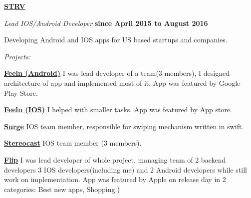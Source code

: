 \documentclass[10pt]{article}
\newenvironment{outerlist}[0]%
        {\begin{itemize}}
        {\end{itemize}
         \vspace{-.6\baselineskip}}
\newenvironment{innerlist}[0]%
        {\begin{compactitem}}
        {\end{compactitem}}
\newcommand{\blankline}{\quad\pagebreak[2]}
\begin{document}
\href{http://www.strv.com/}{\textbf{STRV}}
\begin{outerlist}
  \item[] \textit{Lead IOS/Android Developer}%
          \hfill \textbf{since April 2015 to August 2016}
  \begin{innerlist}
    \item[] Developing Android and IOS apps for US based startups
and companies.
  \end{innerlist}
    \item[] \textit{Projects:}%
    	 \begin{innerlist}
	 	 \item[]  \href{https://play.google.com/store/apps/details?id=com.feeln.android}{\textbf{Feeln (Android)}} \newline
		 I was lead developer of a team(3 members), I designed architecture of app
and implemented most of it. App was featured by Google Play Store.
		\newline
	 	 \item[]  \href{https://itunes.apple.com/us/app/feeln/id472567577?mt=8}{\textbf{Feeln (IOS)}} \newline
		 I helped with smaller tasks. App was featured by App store.
		 \newline
	 	 \item[]  \href{https://itunes.apple.com/us/app/surge-gay-dating-app-for-gay/id709551897?mt=8}{\textbf{Surge}} \newline
		 IOS team member, responsible for swiping mechanism written in
swift.
		\newline
	 	 \item[]  \href{https://itunes.apple.com/us/app/stereocast-exclusive-music/id1027457656?mt=8}{\textbf{Stereocast}} \newline
		 IOS team member (3 members).
		 \newline
	 	 \item[]  \href{https://itunes.apple.com/us/app/flip-everyones-sneaker-connect/id961287853?mt=8}{\textbf{Flip}} \newline
		  I was lead developer of whole project, managing
team of 2 backend developers 3 IOS developers(including me) and 2
Android developers while still work on implementation. App was featured
by Apple on release day in 2 categories: Best new apps, Shopping.)
	 \end{innerlist}
\end{outerlist}

\blankline
\end{document}
